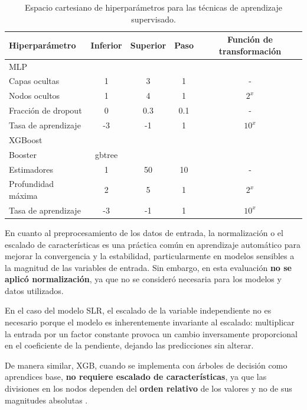 \begin{table}[ht]
\caption{Espacio cartesiano de hiperparámetros para las técnicas de aprendizaje supervisado.}
\label{tab:gridsearch}
\centering
\resizebox{\linewidth}{!} {
\def\arraystretch{1.5}
\begin{tabular}{lcccc}
\hline
\textbf{Hiperparámetro} & \textbf{Inferior} & \textbf{Superior} & \textbf{Paso} & \textbf{Función de transformación} \\
\hline
MLP\\
\hline
 Capas ocultas        & 1    & 3     & 1   & - \\
 Nodos ocultos        & 1    & 4     & 1   & $2^{x}$ \\
 Fracción de dropout  & 0    & 0.3   & 0.1 & - \\
 Tasa de aprendizaje  & -3   & -1    & 1   & $10^{x}$ \\
\hline
XGBoost\\
\hline
Booster               & gbtree & & & \\
 Estimadores          & 1    & 50    & 10  & - \\
 Profundidad máxima   & 2    & 5     & 1   & $2^{x}$ \\
 Tasa de aprendizaje  & -3   & -1    & 1   & $10^{x}$ \\
\hline
\end{tabular}}
\end{table}

En cuanto al preprocesamiento de los datos de entrada, la normalización o el escalado de características es una práctica común en aprendizaje automático para mejorar la convergencia y la estabilidad, particularmente en modelos sensibles a la magnitud de las variables de entrada. Sin embargo, en esta evaluación \textbf{no se aplicó normalización}, ya que no se consideró necesaria para los modelos y datos utilizados.  

En el caso del modelo SLR, el escalado de la variable independiente no es necesario porque el modelo es inherentemente invariante al escalado: multiplicar la entrada por un factor constante provoca un cambio inversamente proporcional en el coeficiente de la pendiente, dejando las predicciones sin alterar.  

De manera similar, XGB, cuando se implementa con árboles de decisión como aprendices base, \textbf{no requiere escalado de características}, ya que las divisiones en los nodos dependen del \textbf{orden relativo} de los valores y no de sus magnitudes absolutas \cite{Soria2022, Chen2016}.  

